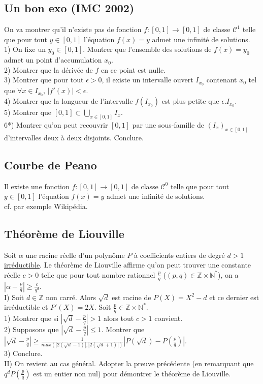 \documentclass{article}
\begin{document}
\subsection{Un bon exo (IMC 2002)}
On va montrer qu'il n'existe pas de fonction $f:[0,1]\to[0,1]$ de classe $\mathcal{C}^1$ telle que pour tout $y\in[0,1]$ l'\'equation $f(x)=y$ admet une infinit\'e de solutions.\\
1) On fixe un $y_0\in[0,1]$. Montrer que l'ensemble des solutions de $f(x)=y_0$ admet un point d'accumulation $x_0$.\\
2) Montrer que la d\'eriv\'ee de $f$ en ce point est nulle.\\
3) Montrer que pour tout $\epsilon>0$, il existe un intervalle ouvert $I_{x_0}$ contenant $x_0$ tel que $\forall x\in I_{x_0}$, $|f'(x)|<\epsilon$.\\
4) Montrer que la longueur de l'intervalle $f(I_{x_0})$ est plus petite que $\epsilon.I_{x_0}$.\\
5) Montrer que $[0,1]\subset\bigcup\limits_{x\in[0,1]}I_x$.\\
6*) Montrer qu'on peut recouvrir $[0,1]$ par une sous-famille de $(I_x)_{x\in[0,1]}$ d'intervalles deux \`a deux disjoints. Conclure.

\subsection{Courbe de Peano}
Il existe une fonction $f:[0,1]\to[0,1]$ de classe $\mathcal{C}^0$ telle que pour tout $y\in[0,1]$ l'\'equation $f(x)=y$ admet une infinit\'e de solutions.\\
cf. par exemple Wikip\'edia.

\subsection{Th\'eor\`eme de Liouville}
Soit $\alpha$ une racine r\'eelle d'un polyn\^ome $P$ \`a coefficients entiers de degr\'e $d>1$ \underline{irr\'eductible}. Le th\'eor\`eme de Liouville affirme qu'on peut trouver une constante r\'eelle $c>0$ telle que pour tout nombre rationnel $\frac{p}{q}$ ($(p,q)\in\mathbb{Z}\times\mathbb{N}^*$), on a $|\alpha-\frac{p}{q}|\geq\frac{c}{q^d}$.\\
I) Soit $d\in\mathbb{Z}$ non carr\'e. Alors $\sqrt{d}$ est racine de $P(X)=X^2-d$ et ce dernier est irr\'eductible et $P'(X)=2X$. Soit $\frac{p}{q}\in\mathbb{Z}\times\mathbb{N}^*$.\\
1) Montrer que si $|\sqrt{d}-\frac{p}{q}|>1$ alors tout $c>1$ convient.\\
2) Supposons que $|\sqrt{d}-\frac{p}{q}|\leq 1$. Montrer que $|\sqrt{d}-\frac{p}{q}|\geq\frac{1}{max(|2(\sqrt{d}-1)|, |2(\sqrt{d}+1)|)}|P(\sqrt{d})-P(\frac{p}{q})|$.\\
3) Conclure.\\
II) On revient au cas g\'en\'eral. Adopter la preuve pr\'ec\'edente (en remarquant que $q^dP(\frac{p}{q})$ est un entier non nul) pour d\'emontrer le th\'eor\`eme de Liouville.
\end{document}
